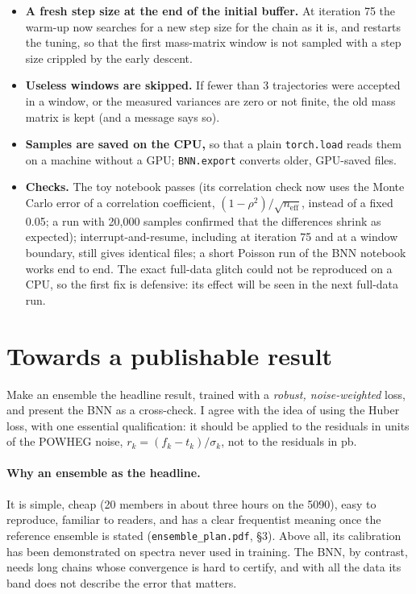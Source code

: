 \documentclass[11pt]{article}
\newcommand{\file}[1]{\nolinkurl{#1}}
\newcommand{\code}[1]{\texttt{#1}}
\begin{document}
\begin{itemize}
  \item \textbf{A fresh step size at the end of the initial buffer.} At iteration 75 the
    warm-up now searches for a new step size for the chain as it is, and restarts the
    tuning, so that the first mass-matrix window is not sampled with a step size crippled
    by the early descent.
  \item \textbf{Useless windows are skipped.} If fewer than 3 trajectories were accepted in
    a window, or the measured variances are zero or not finite, the old mass matrix is kept
    (and a message says so).
  \item \textbf{Samples are saved on the CPU,} so that a plain \code{torch.load} reads them
    on a machine without a GPU; \code{BNN.export} converts older, GPU-saved files.
  \item \textbf{Checks.} The toy notebook passes (its correlation check now uses the Monte
    Carlo error of a correlation coefficient, $(1-\rho^2)/\sqrt{n_\text{eff}}$, instead of
    a fixed 0.05; a run with 20,000 samples confirmed that the differences shrink as
    expected); interrupt-and-resume, including at iteration 75 and at a window boundary,
    still gives identical files; a short Poisson run of the BNN notebook works end to end.
    The exact full-data glitch could not be reproduced on a CPU, so the first fix is
    defensive: its effect will be seen in the next full-data run.
\end{itemize}

\section{Towards a publishable result}
\label{sec:paper}

\begin{keyidea}[Proposal]
Make an ensemble the headline result, trained with a \emph{robust, noise-weighted}
loss, and present the BNN as a cross-check. I agree with the idea of using the Huber
loss, with one essential qualification: it should be applied to the residuals in units of
the POWHEG noise, $r_k = (f_k - t_k)/\sigma_k$, not to the residuals in pb.
\end{keyidea}

\paragraph{Why an ensemble as the headline.} It is simple, cheap (20 members in about three
hours on the 5090), easy to reproduce, familiar to readers, and has a clear frequentist
meaning once the reference ensemble is stated (\file{ensemble_plan.pdf}, \S3). Above all,
its calibration has been demonstrated on spectra never used in training. The BNN, by
contrast, needs long chains whose convergence is hard to certify, and with all the data its
band does not describe the error that matters.
\end{document}
